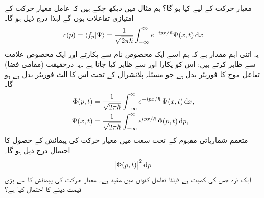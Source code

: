 معیار حرکت کے لیے کیا ہو گا؟ ہم مثال  میں دیکھ چکے ہیں کہ عامل معیار حرکت کے امتیازی تفاعلات  ہوں گے لہٰذا درج ذیل ہو گا۔
\begin{align}
c(p) = \langle f_{p} | \Psi \rangle = \frac{1}{\sqrt{2\pi\hslash}} \int_{-\infty}^{\infty} e^{-ipx/\hslash} \Psi (x,t)\dif x
\end{align}
یہ اتنی اہم مقدار ہے کہ ہم اسے ایک مخصوص نام سے پکارتے اور ایک مخصوص علامت سے ظاہر کرتے ہیں: اس کو پکارا اور  سے ظاہر کیا جاتا ہے ۔یہ درحقیقت (مقامی فضا) تفاعل موج  کا فوریئر بدل ہے جو مسئلہ پلانشرال کے تحت اس کا الٹ فوریئر بدل ہے ہو گا۔
\begin{align}
\Phi(p,t) &= \frac{1}{\sqrt{2\pi\hslash}} \int_{-\infty}^{\infty} e^{-ipx/\hslash}\, \Psi (x,t) \dif x, \\ 
\Psi(x,t) &= \frac{1}{\sqrt{2\pi\hslash}} \int_{-\infty}^{\infty} e^{ipx/\hslash}\, \Phi (p,t) \dif p,
\end{align}
متعمم شماریاتی مفہوم کے تحت سعت  میں معیار حرکت کی پیمائش کے حصول کا احتمال درج ذیل ہو گا۔ 
\begin{align}
\abs{ \Phi(p,t)}^{2}\dif p
\end{align}
 ایک ذرہ جس کی کمیت  ہے ڈیلٹا تفاعل کنواں  میں مقید ہے۔ معیار حرکت کی پیمائش کا  سے بڑی قیمت دینے کا احتمال کیا ہے؟ 
 
